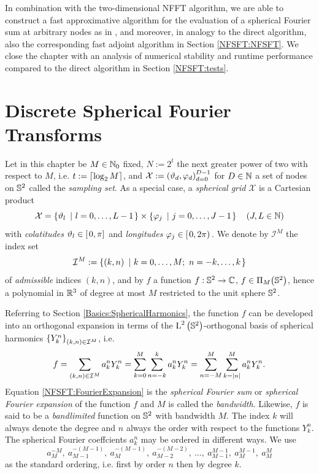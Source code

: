 In combination with the two-dimensional NFFT algorithm, we are able 
to construct a fast approximative algorithm for the evaluation
of a spherical Fourier sum at arbitrary nodes as in \cite{kupo02},
and moreover, in analogy to the direct algorithm, also the corresponding
fast adjoint algorithm in Section \ref{NFSFT:NFSFT}.
We close the chapter with an analysis of numerical stability and runtime 
performance compared to the direct algorithm in Section \ref{NFSFT:tests}.

\section{Discrete Spherical Fourier Transforms}
\label{NFSFT:dsfts}

Let in this chapter be $M \in \mathbb{N}_{0}$ fixed, $N := 2^t$ the 
next greater power of two with respect to $M$, i.e. $t := 
{\left\lceil\log_2 M\right\rceil}$, and $\mathcal{X} := 
\left(\vartheta_d,\varphi_d\right)_{d=0}^{D-1}$ for $D \in \mathbb{N}$
a set of nodes on $\mathbb{S}^2$ called the \emph{sampling set}. 
As a special case, a \emph{spherical grid} 
$\mathcal{X}$ is a Cartesian product 
\[
  \mathcal{X} = \left\{\vartheta_{l}\ \left|\ l=0,\ldots,L-1\right.\right\rbrace \times \left\{\varphi_{j}\ \left|\ j=0,\ldots,J-1\right.\right\rbrace \quad \left(J,L \in \mathbb{N}\right)
\]
with \emph{colatitudes} $\vartheta_{l} \in \left[\left.0,\pi\right]\right.$ and \emph{longitudes} $\varphi_{j} \in \left[\left.0,2\pi\right)\right.$.
We denote by $\mathcal{I}^M$ the index set
\[
  \mathcal{I}^M := \left\{\left(k,n\right)\ \left|\ k=0,\ldots,M;\ n=-k,\ldots,k\right.\right\rbrace
\]
of \emph{admissible} indices $(k,n)$, and by $f$ a function $f: \mathbb{S}^2 \rightarrow \mathbb{C}$, $f \in \Pi_{M}{\hspace{-0.4ex}}\left(\mathbb{S}^2\right)$, hence a polynomial in $\mathbb{R}^3$ of degree at most $M$ restricted to the unit sphere $\mathbb{S}^2$.

Referring to Section \ref{Basics:SphericalHarmonics}, the function $f$ can be developed into 
an orthogonal expansion in terms of the $\text{\rm{L}}^{2}\left(\mathbb{S}^2\right)$-orthogonal basis of
spherical harmonics $\left\{Y_{k}^n\right\rbrace_{(k,n) \in \mathcal{I}^M}$, i.e.
\begin{equation}
  \label{NFSFT:FourierExpansion} 
  f = \sum_{\left(k,n\right) \in\mathcal{I}^M} a_k^n Y_{k}^n = \sum_{k=0}^M \sum_{n=-k}^k a_k^n Y_{k}^n = \sum_{n=-M}^M \sum_{k=\left\vert n\right\vert}^M a_k^n Y_{k}^n.
\end{equation}  
Equation \eqref{NFSFT:FourierExpansion} is the \emph{spherical Fourier sum} or 
\emph{spherical Fourier expansion} of the function $f$ and $M$ is called the 
\emph{bandwidth}. Likewise, $f$ is said to be a \emph{bandlimited} function 
on $\mathbb{S}^2$ with bandwidth $M$. The index $k$ will always denote the 
degree and $n$ always the order with respect to the functions $Y_{k}^n$. 
The spherical Fourier coeffcients $a_{k}^n$ may be ordered 
in different ways. We use
\begin{equation}
  \label{Basics:Ordering}
  a_{M}^{-M},\: a_{M-1}^{-(M-1)},\: a_{M}^{-(M-1)},\: a_{M-2}^{-(M-2)},
  \: \ldots,\: a_{M-1}^{M-1},\: a_{M}^{M-1},\: a_{M}^{M}
\end{equation}
as the standard ordering, i.e. first by order $n$ then by degree $k$.

